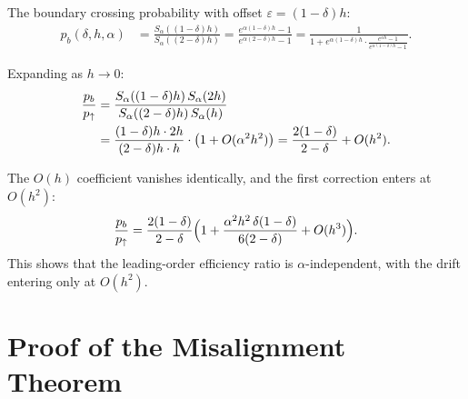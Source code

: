 \documentclass[11pt]{article}
\theoremstyle{definition}
\theoremstyle{remark}
\begin{document}
The boundary crossing probability with offset $\varepsilon = (1-\delta)h$:
\begin{align}
p_b(\delta, h, \alpha)
&= \frac{S_\alpha((1-\delta)h)}{S_\alpha((2-\delta)h)}
= \frac{e^{\alpha(1-\delta)h} - 1}{e^{\alpha(2-\delta)h} - 1}
= \frac{1}{1 + e^{\alpha(1-\delta)h} \cdot
\frac{e^{\alpha h} - 1}{e^{\alpha(1-\delta)h} - 1}}.
\label{eq:p_b_general}
\end{align}

Expanding as $h \to 0$:
\begin{align}
\frac{p_b}{p_\uparrow}
&= \frac{S_\alpha((1-\delta)h)\,S_\alpha(2h)}{%
S_\alpha((2-\delta)h)\,S_\alpha(h)} \notag \\
&= \frac{(1-\delta)h \cdot 2h}{(2-\delta)h \cdot h}
\cdot \bigl(1 + O(\alpha^2 h^2)\bigr)
= \frac{2(1-\delta)}{2-\delta} + O(h^2).
\label{eq:ratio_general}
\end{align}

The $O(h)$ coefficient vanishes identically, and the first
correction enters at $O(h^2)$:
\begin{equation}\label{eq:R_Oh}
\frac{p_b}{p_\uparrow}
= \frac{2(1-\delta)}{2-\delta}
\Bigl(1 + \frac{\alpha^2 h^2\,\delta(1-\delta)}{%
6(2-\delta)} + O(h^3)\Bigr).
\end{equation}
This shows that the leading-order efficiency ratio is
$\alpha$-independent, with the drift entering only at $O(h^2)$.

\section{Proof of the Misalignment Theorem}\label{app:misaligned}
\end{document}
